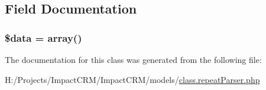 \subsection{Field Documentation}
\hypertarget{classrepeatParser_a6efc15b5a2314dd4b5aaa556a375c6d6}{
\subsubsection[{\$data}]{\setlength{\rightskip}{0pt plus 5cm}\$data = array()}}
\label{classrepeatParser_a6efc15b5a2314dd4b5aaa556a375c6d6}


The documentation for this class was generated from the following file:\begin{DoxyCompactItemize}
\item 
H:/Projects/ImpactCRM/ImpactCRM/models/\hyperlink{class_8repeatParser_8php}{class.repeatParser.php}\end{DoxyCompactItemize}
